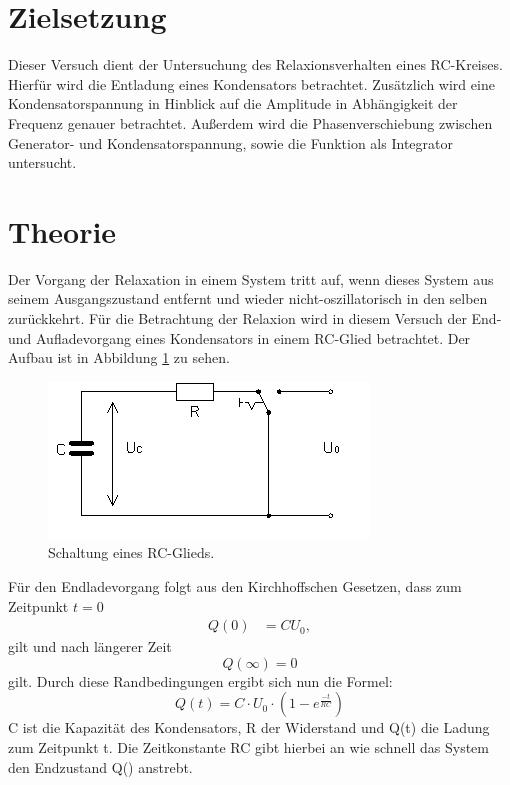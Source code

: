 
  \section{Zielsetzung}
  Dieser Versuch dient der Untersuchung des Relaxionsverhalten
  eines RC-Kreises.
  Hierfür wird die Entladung eines Kondensators betrachtet.
  Zusätzlich wird eine Kondensatorspannung in Hinblick auf die Amplitude
  in Abhängigkeit der Frequenz
  genauer betrachtet.
  Außerdem wird die Phasenverschiebung zwischen Generator-
  und Kondensatorspannung,
  sowie die Funktion als Integrator untersucht.

  \section{Theorie}
  Der Vorgang der Relaxation in einem System tritt auf,
  wenn dieses System aus seinem Ausgangszustand entfernt
  und wieder nicht-oszillatorisch in den selben zurückkehrt.\newline
Für die Betrachtung der Relaxion wird in diesem Versuch
der End- und Aufladevorgang eines Kondensators in einem RC-Glied betrachtet.
Der Aufbau ist in Abbildung \ref{fig:bild1} zu sehen.
\begin{figure}[H]
  \centering
  \includegraphics[scale=1.0]{bilder/bild11.png}
  \caption{Schaltung eines RC-Glieds.}
  \label{fig:bild1}
\end{figure}
Für den Endladevorgang folgt aus den Kirchhoffschen Gesetzen,
dass zum Zeitpunkt $ t=0$
\begin{align*}
Q(0)&=CU_0,
\label{eq:RB}
\end{align*}
gilt und nach längerer Zeit
\begin{equation*}
  Q(\infty)=0
\end{equation*}
gilt.
Durch diese Randbedingungen ergibt sich nun die Formel:
\begin{equation*}
  Q(t)= C \cdot U_0\cdot (1-e^{\frac{-t}{RC}})
\end{equation*}
 C ist die Kapazität des Kondensators, R der Widerstand und Q(t) die Ladung zum Zeitpunkt t.\newline
Die Zeitkonstante RC gibt hierbei an wie schnell das System den Endzustand Q(\infty) anstrebt.\newline

